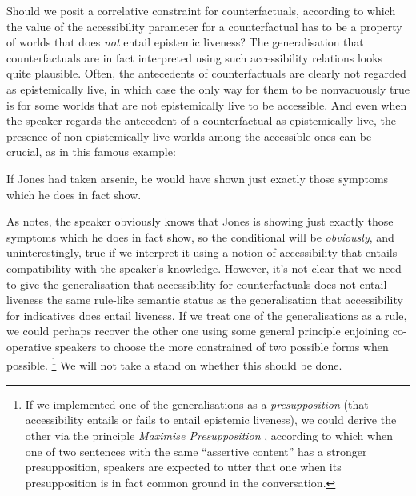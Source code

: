 \documentclass[If.tex]{subfiles}
\begin{document}
Should we posit a correlative constraint for counterfactuals, according to which the value of the accessibility parameter for a counterfactual has to be a property of worlds that does \emph{not} entail epistemic liveness?  The generalisation that counterfactuals are in fact interpreted using such accessibility relations looks quite plausible.  Often, the antecedents of counterfactuals are clearly not regarded as epistemically live, in which case the only way for them to be nonvacuously true is for some worlds that are not epistemically live to be accessible.  And even when the speaker regards the antecedent of a counterfactual as epistemically live, the presence of non-epistemically live worlds among the accessible ones can be crucial, as in this famous example:
\begin{prop}
	\nitem
	If Jones had taken arsenic, he would have shown just exactly those symptoms which he does in fact show. \citep{AndersonNSCC}
\end{prop}
As \citet{vonFintelPSC} notes, the speaker obviously knows that Jones is showing just exactly those symptoms which he does in fact show, so the conditional will be \emph{obviously}, and uninterestingly, true if we interpret it using a notion of accessibility that entails compatibility with the speaker's knowledge.  However, it's not clear that we need to give the generalisation that accessibility for counterfactuals does not entail liveness the same rule-like semantic status as the generalisation that accessibility for indicatives does entail liveness.  If we treat one of the generalisations as a rule, we could perhaps recover the other one using some general principle enjoining co-operative speakers to choose the more constrained of two possible forms when possible.%
\footnote{If we implemented one of the generalisations as a \emph{presupposition} (that accessibility entails or fails to entail epistemic liveness), we could derive the other via the principle \emph{Maximise Presupposition} \citep{HeimAD}, according to which when one of two sentences with the same “assertive content” has a stronger presupposition, speakers are expected to utter that one when its presupposition is in fact common ground in the conversation.}
We will not take a stand on whether this should be done.  
\end{document}
